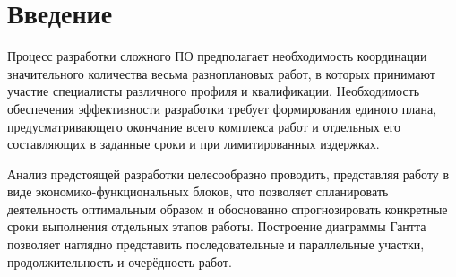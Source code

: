 \section{Введение} \label{economics_introduction}

Процесс разработки сложного ПО предполагает необходимость координации значительного количества весьма разноплановых работ, в которых принимают участие специалисты различного профиля и квалификации. Необходимость обеспечения эффективности разработки требует формирования единого плана, предусматривающего окончание всего комплекса работ и отдельных его составляющих в заданные сроки и при лимитированных издержках.

\vspace{\baselineskip}
Анализ предстоящей разработки целесообразно проводить, представляя работу в виде экономико-функциональных блоков, что позволяет спланировать деятельность оптимальным образом и обоснованно спрогнозировать конкретные сроки выполнения отдельных этапов работы. Построение диаграммы Гантта позволяет наглядно представить последовательные и параллельные участки, продолжительность и очерёдность работ.